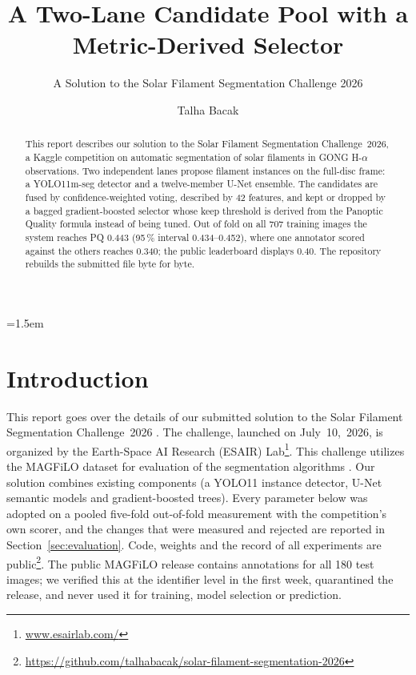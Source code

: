 \documentclass[sigconf]{acmart}
\begin{document}
\emergencystretch=1.5em %

\title{A Two-Lane Candidate Pool with a Metric-Derived Selector}
\subtitle{A Solution to the Solar Filament Segmentation Challenge 2026} %

\author{Talha Bacak}

\begin{abstract}
    This report describes our solution to the Solar Filament Segmentation Challenge~2026, a Kaggle competition on automatic segmentation of solar filaments in GONG H-$\alpha$ observations. Two independent lanes propose filament instances on the full-disc frame: a YOLO11m-seg detector and a twelve-member U-Net ensemble. The candidates are fused by confidence-weighted voting, described by 42 features, and kept or dropped by a bagged gradient-boosted selector whose keep threshold is derived from the Panoptic Quality formula instead of being tuned. Out of fold on all 707 training images the system reaches PQ 0.443 (95\,\% interval 0.434--0.452), where one annotator scored against the others reaches 0.340; the public leaderboard displays 0.40. The repository rebuilds the submitted file byte for byte.
\end{abstract}

\maketitle

\section{Introduction}
    This report goes over the details of our submitted solution to the Solar Filament Segmentation Challenge~2026 \cite{filament-segmentation-2026}. The challenge, launched on July~10,~2026, is organized by the Earth-Space AI Research (ESAIR) Lab\footnote{\href{https://www.esairlab.com/home}{www.esairlab.com/}}. This challenge utilizes the MAGFiLO dataset for evaluation of the segmentation algorithms \cite{ahmadzadeh2024dataset}. Our solution combines existing components (a YOLO11 instance detector, U-Net semantic models and gradient-boosted trees). Every parameter below was adopted on a pooled five-fold out-of-fold measurement with the competition's own scorer, and the changes that were measured and rejected are reported in Section~\ref{sec:evaluation}. Code, weights and the record of all experiments are public\footnote{\url{https://github.com/talhabacak/solar-filament-segmentation-2026}}. The public MAGFiLO release contains annotations for all 180 test images; we verified this at the identifier level in the first week, quarantined the release, and never used it for training, model selection or prediction.
\end{document}
